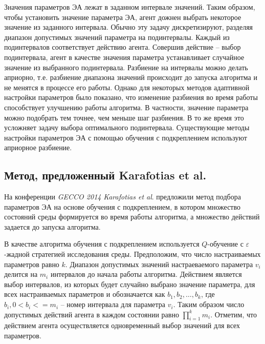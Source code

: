 Значения параметров ЭА лежат в заданном интервале значений. Таким образом, чтобы установить значение параметра ЭА, агент дожнен выбрать некоторое значение из заданного интервала. Обычно эту задачу дискретизируют, разделяя диапазон допустимых значений параметра на подинтервалы. Каждый из подинтервалов соответствует действию агента. Совершив действие -- выбор подинтервала, агент в качестве значения параметра устанавливает случайное значение из выбранного подинтервала. Разбиение на интервалы можно делать априорно, т.е. разбиение диапазона значений происходит до запуска алгоритма и не менятся в процессе его работы. Однако для некоторых методов адаптивной настройки параметров было показано, что изменение разбиения во время работы способствует улучшению работы алгоритма. В частности, значение параметра можно подобрать тем точнее, чем меньше шаг разбиения. В то же время это усложняет задачу выбора оптимального подинтервала. Существующие методы настройки параметров ЭА с помощью обучения с подкреплением используют априорное разбиение.

\subsection{Метод, предложенный Karafotias et al.}
\label{karafotias}

На конференции \textit{GECCO 2014} \textit{Karafotias et al}. предложили метод подбора параметров ЭА на основе обучения с подкреплением, в котором множество состояний среды формируется во время работы алгоритма, а множество действий задается до запуска алгоритма.

В качестве алгоритма обучения с подкреплением используется $Q$-обучение с $\varepsilon$-жадной стратегией исследования среды.
Предположим, что число настраиваемых параметров равно $k$. Диапазон допустимых значений настраеваемого параметра $v_i$ делится на $m_i$ интервалов до начала работы алгоритма. Действием является выбор интервалов, из которых будет случайно выбрано значение параметра, для всех настраиваемых параметров и обозначается как $b_1, b_2, \ldots, b_k$, где $b_i, 0 < b_i <= m_i$ -- номер интервала для параметра $v_i$. Таким образом число допустимых действий агента в каждом состоянии равно $\prod\limits_{i = 1}^k{m_i}$. Отметим, что действием агента осуществляется одновременный выбор значений для всех параметров. 

